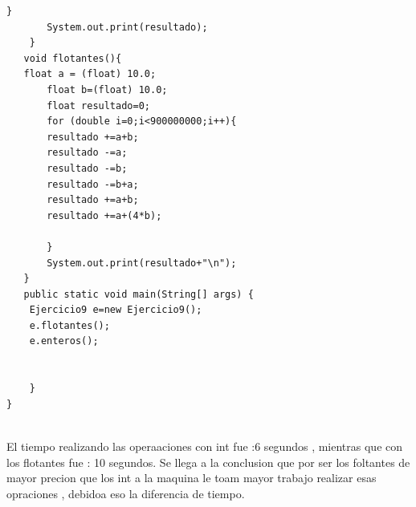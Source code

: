 \documentclass[12pt,oneside]{article}
\begin{document}
\begin{itemize}
\begin{lstlisting}[frame=single]
       }
       System.out.print(resultado);
    }
   void flotantes(){
   float a = (float) 10.0;
       float b=(float) 10.0;
       float resultado=0;
       for (double i=0;i<900000000;i++){
       resultado +=a+b;
       resultado -=a;
       resultado -=b;
       resultado -=b+a;
       resultado +=a+b;
       resultado +=a+(4*b);
       
       }
       System.out.print(resultado+"\n");
   }
   public static void main(String[] args) {
    Ejercicio9 e=new Ejercicio9();
    e.flotantes();
    e.enteros();
    
    
    }
}
 

\end{lstlisting}

El tiempo realizando las operaaciones con int fue :6 segundos ,   mientras que con los flotantes fue : 10 segundos.    Se llega a la conclusion que por ser los foltantes de mayor precion que los int a la maquina le toam mayor trabajo realizar esas opraciones , debidoa  eso la diferencia de tiempo. \\

\end{itemize}
\end{document}
